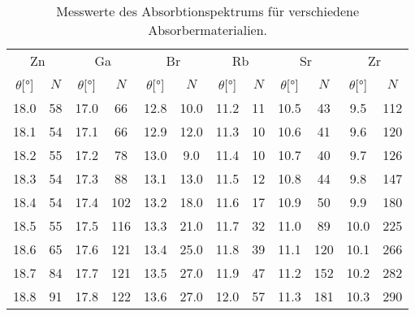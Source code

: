 \begin{table}[H]
    \centering
    \caption{Messwerte des Absorbtionspektrums für verschiedene Absorbermaterialien.}
    \begin{tabular}{c c c c c c c c c c c c}
    \toprule
    \multicolumn{2}{c}{Zn} &
    \multicolumn{2}{c}{Ga} &
    \multicolumn{2}{c}{Br} &
    \multicolumn{2}{c}{Rb} &
    \multicolumn{2}{c}{Sr} &
    \multicolumn{2}{c}{Zr}\\
    \cmidrule(lr){1-2}\cmidrule(lr){3-4}\cmidrule(lr){5-6}\cmidrule(lr){7-8}\cmidrule(lr){9-10}\cmidrule(lr){11-12}
    {$\theta [\si{\degree}$]} &
    {$N$} &
    {$\theta [\si{\degree}$]} &
    {$N$} &
    {$\theta [\si{\degree}$]} &
    {$N$} &
    {$\theta [\si{\degree}$]} &
    {$N$} &
    {$\theta [\si{\degree}$]} &
    {$N$} &
    {$\theta [\si{\degree}$]} &
    {$N$} \\
    \midrule
    \num{18.0} & \num{58}  &\num{17.0} & \num{66}  & \num{12.8}  & \num{10.0} & \num{11.2} & \num{11} & \num{10.5} & \num{43}  & \num{9.5}  & \num{112} \\
    \num{18.1} & \num{54}  &\num{17.1} & \num{66}  & \num{12.9}  & \num{12.0} & \num{11.3} & \num{10} & \num{10.6} & \num{41}  & \num{9.6}  & \num{120} \\
    \num{18.2} & \num{55}  &\num{17.2} & \num{78}  & \num{13.0}  & \num{9.0}  & \num{11.4} & \num{10} & \num{10.7} & \num{40}  & \num{9.7}  & \num{126} \\
    \num{18.3} & \num{54}  &\num{17.3} & \num{88}  & \num{13.1}  & \num{13.0} & \num{11.5} & \num{12} & \num{10.8} & \num{44}  & \num{9.8}  & \num{147} \\
    \num{18.4} & \num{54}  &\num{17.4} & \num{102} & \num{13.2}  & \num{18.0} & \num{11.6} & \num{17} & \num{10.9} & \num{50}  & \num{9.9}  & \num{180} \\
    \num{18.5} & \num{55}  &\num{17.5} & \num{116} & \num{13.3}  & \num{21.0} & \num{11.7} & \num{32} & \num{11.0} & \num{89}  & \num{10.0} & \num{225} \\
    \num{18.6} & \num{65}  &\num{17.6} & \num{121} & \num{13.4}  & \num{25.0} & \num{11.8} & \num{39} & \num{11.1} & \num{120} & \num{10.1} & \num{266} \\
    \num{18.7} & \num{84}  &\num{17.7} & \num{121} & \num{13.5}  & \num{27.0} & \num{11.9} & \num{47} & \num{11.2} & \num{152} & \num{10.2} & \num{282} \\
    \num{18.8} & \num{91}  &\num{17.8} & \num{122} & \num{13.6}  & \num{27.0} & \num{12.0} & \num{57} & \num{11.3} & \num{181} & \num{10.3} & \num{290} \\

\end{tabular}
\end{table}
